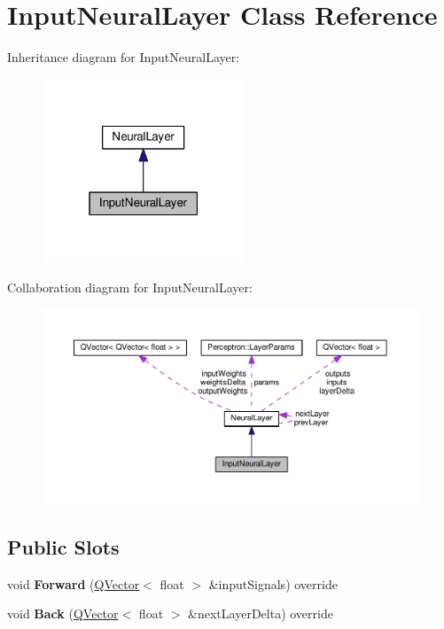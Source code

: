 \hypertarget{class_input_neural_layer}{}\section{Input\+Neural\+Layer Class Reference}
\label{class_input_neural_layer}


Inheritance diagram for Input\+Neural\+Layer\+:\nopagebreak
\begin{figure}[H]
\begin{center}
\leavevmode
\includegraphics[width=171pt]{class_input_neural_layer__inherit__graph}
\end{center}
\end{figure}


Collaboration diagram for Input\+Neural\+Layer\+:\nopagebreak
\begin{figure}[H]
\begin{center}
\leavevmode
\includegraphics[width=350pt]{class_input_neural_layer__coll__graph}
\end{center}
\end{figure}
\subsection*{Public Slots}
\begin{DoxyCompactItemize}
\item 
void {\bfseries Forward} (\hyperlink{class_q_vector}{Q\+Vector}$<$ float $>$ \&input\+Signals) override\hypertarget{class_input_neural_layer_a14633f26c2f18e3ca4bd95feb4eb9a91}{}\label{class_input_neural_layer_a14633f26c2f18e3ca4bd95feb4eb9a91}

\item 
void {\bfseries Back} (\hyperlink{class_q_vector}{Q\+Vector}$<$ float $>$ \&next\+Layer\+Delta) override\hypertarget{class_input_neural_layer_a6a6e5df6ba9100259dda2d7849a8f5b7}{}\label{class_input_neural_layer_a6a6e5df6ba9100259dda2d7849a8f5b7}

\end{DoxyCompactItemize}
